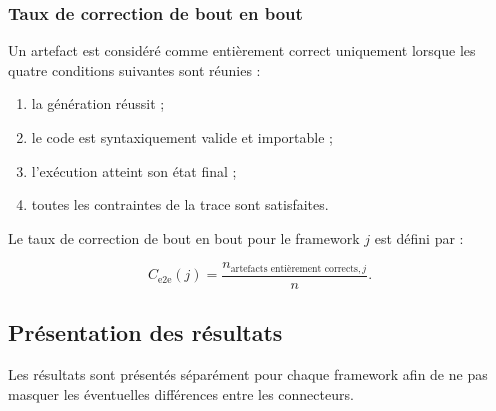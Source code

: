 \subsubsection{Taux de correction de bout en bout}

Un artefact est considéré comme entièrement correct uniquement lorsque
les quatre conditions suivantes sont réunies :

\begin{enumerate}
    \item la génération réussit ;
    \item le code est syntaxiquement valide et importable ;
    \item l'exécution atteint son état final ;
    \item toutes les contraintes de la trace sont satisfaites.
\end{enumerate}

Le taux de correction de bout en bout pour le framework $j$ est défini
par :

\begin{equation}
C_{\mathrm{e2e}}(j)
=
\frac{
    n_{\text{artefacts entièrement corrects},j}
}{
    n
}.
\label{eq:correction-bout-en-bout}
\end{equation}


\subsection{Présentation des résultats}
\label{subsec:resultats-correction}

Les résultats sont présentés séparément pour chaque framework afin de
ne pas masquer les éventuelles différences entre les connecteurs.

